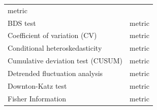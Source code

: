 \documentclass[12pt,twoside,openany]{reedthesis}
\begin{document}
\begin{longtable}[]{@{}lc@{}}
\begin{minipage}[t]{0.34\columnwidth}
metric\strut
\end{minipage}\tabularnewline
\begin{minipage}[t]{0.31\columnwidth}\raggedright\strut
BDS test\strut
\end{minipage} & \begin{minipage}[t]{0.34\columnwidth}\centering\strut
metric\strut
\end{minipage}\tabularnewline
\begin{minipage}[t]{0.31\columnwidth}\raggedright\strut
Coefficient of variation (CV)\strut
\end{minipage} & \begin{minipage}[t]{0.34\columnwidth}\centering\strut
metric\strut
\end{minipage}\tabularnewline
\begin{minipage}[t]{0.31\columnwidth}\raggedright\strut
Conditional heteroskedasticity\strut
\end{minipage} & \begin{minipage}[t]{0.34\columnwidth}\centering\strut
metric\strut
\end{minipage}\tabularnewline
\begin{minipage}[t]{0.31\columnwidth}\raggedright\strut
Cumulative deviation test (CUSUM)\strut
\end{minipage} & \begin{minipage}[t]{0.34\columnwidth}\centering\strut
metric\strut
\end{minipage}\tabularnewline
\begin{minipage}[t]{0.31\columnwidth}\raggedright\strut
Detrended fluctuation analysis\strut
\end{minipage} & \begin{minipage}[t]{0.34\columnwidth}\centering\strut
metric\strut
\end{minipage}\tabularnewline
\begin{minipage}[t]{0.31\columnwidth}\raggedright\strut
Downton-Katz test\strut
\end{minipage} & \begin{minipage}[t]{0.34\columnwidth}\centering\strut
metric\strut
\end{minipage}\tabularnewline
\begin{minipage}[t]{0.31\columnwidth}\raggedright\strut
Fisher Information\strut
\end{minipage} & \begin{minipage}[t]{0.34\columnwidth}\centering\strut
metric\strut
\end{minipage}\tabularnewline

\end{longtable}
\end{document}

